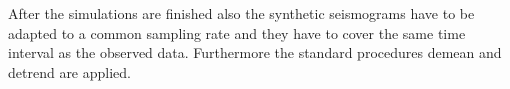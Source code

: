 After the simulations are finished also the synthetic seismograms have to be adapted to a common sampling rate and 
they have to cover the same time interval as the observed data.
Furthermore the standard procedures demean and detrend are applied.








